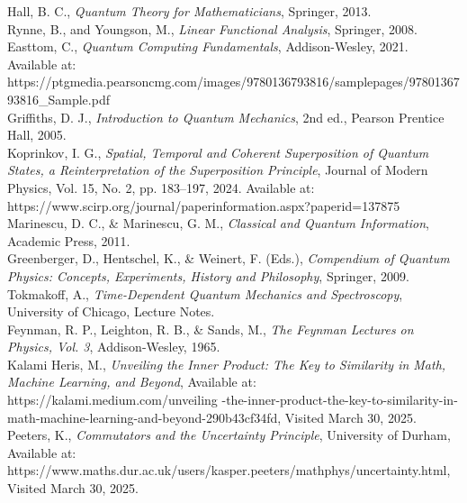 \noindent[13] Hall, B. C., \textit{Quantum Theory for Mathematicians}, Springer, 2013.\\

\noindent[14] Rynne, B., and Youngson, M., \textit{Linear Functional Analysis}, Springer, 2008.\\

\noindent[15] Easttom, C., \textit{Quantum Computing Fundamentals}, Addison-Wesley, 2021. Available at: https://ptgmedia.pearsoncmg.com/images/9780136793816/samplepages/9780136793816\_Sample.pdf\\

\noindent[16] Griffiths, D. J., \textit{Introduction to Quantum Mechanics}, 2nd ed., Pearson Prentice Hall, 2005.\\

\noindent[17] Koprinkov, I. G., \textit{Spatial, Temporal and Coherent Superposition of Quantum States, a Reinterpretation of the Superposition Principle}, Journal of Modern Physics, Vol. 15, No. 2, pp. 183–197, 2024. Available at: https://www.scirp.org/journal/paperinformation.aspx?paperid=137875\\

\noindent[18] Marinescu, D. C., \& Marinescu, G. M., \textit{Classical and Quantum Information}, Academic Press, 2011.\\

\noindent[19] Greenberger, D., Hentschel, K., \& Weinert, F. (Eds.), \textit{Compendium of Quantum Physics: Concepts, Experiments, History and Philosophy}, Springer, 2009.\\

\noindent[20] Tokmakoff, A., \textit{Time-Dependent Quantum Mechanics and Spectroscopy}, University of Chicago, Lecture Notes.\\

\noindent[21] Feynman, R. P., Leighton, R. B., \& Sands, M., \textit{The Feynman Lectures on Physics, Vol. 3}, Addison-Wesley, 1965.\\

\noindent[22] Kalami Heris, M., \textit{Unveiling the Inner Product: The Key to Similarity in Math, Machine Learning, and Beyond}, Available at: https://kalami.medium.com/unveiling -the-inner-product-the-key-to-similarity-in-math-machine-learning-and-beyond-290b43cf34fd, Visited March 30, 2025.\\

\noindent[23] Peeters, K., \textit{Commutators and the Uncertainty Principle}, University of Durham, Available at: https://www.maths.dur.ac.uk/users/kasper.peeters/mathphys/uncertainty.html, Visited March 30, 2025.\\

